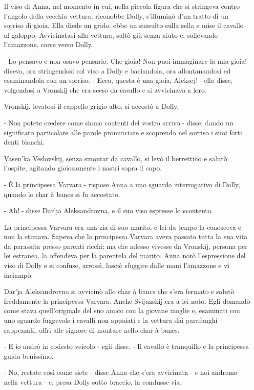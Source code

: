 Il viso di Anna, nel momento in cui, nella piccola figura che si stringeva contro l'angolo della vecchia vettura, riconobbe Dolly, s'illuminò d'un tratto di un sorriso di gioia. Ella diede un grido, ebbe un sussulto sulla sella e mise il cavallo al galoppo. Avvicinatasi alla vettura, saltò giù senza aiuto e, sollevando l'amazzone, corse verso Dolly. 

- Lo pensavo e non osavo pensarlo. Che gioia! Non puoi immaginare la mia gioia!- diceva, ora stringendosi col viso a Dolly e baciandola, ora allontanandosi ed esaminandola con un sorriso. - Ecco, questa è una gioia, Aleksej! - ella disse, volgendosi a Vronskij che era sceso da cavallo e si avvicinava a loro. 

Vronskij, levatosi il cappello grigio alto, si accostò a Dolly. 

- Non potete credere come siamo contenti del vostro arrivo - disse, dando un significato particolare alle parole pronunciate e scoprendo nel sorriso i suoi forti denti bianchi. 

Vasen'ka Veslovskij, senza smontar da cavallo, si levò il berrettino e salutò l'ospite, agitando gioiosamente i nastri sopra il capo. 

- È la principessa Varvara - rispose Anna a uno sguardo interrogativo di Dolly, quando lo char à bancs si fu accostato. 

- Ah! - disse Dar'ja Aleksandrovna, e il suo viso espresse lo scontento. 

La principessa Varvara era una zia di suo marito, e lei da tempo la conosceva e non la stimava. Sapeva che la principessa Varvara aveva passato tutta la sua vita da parassita presso parenti ricchi; ma che adesso vivesse da Vronskij, persona per lei estranea, la offendeva per la parentela del marito. Anna notò l'espressione del viso di Dolly e si confuse, arrossì, lasciò sfuggire dalle mani l'amazzone e vi inciampò. 

Dar'ja Aleksandrovna si avvicinò allo char à bancs che s'era fermato e salutò freddamente la principessa Varvara. Anche Svijazskij era a lei noto. Egli domandò come stava quell'originale del suo amico con la giovane moglie e, esaminati con uno sguardo fuggevole i cavalli non appaiati e la vettura dai parafanghi rappezzati, offrì alle signore di montare nello char à bancs. 

- E io andrò in codesto veicolo - egli disse. - Il cavallo è tranquillo e la principessa guida benissimo. 

- No, restate così come siete - disse Anna che s'era avvicinata - e noi andremo nella vettura - e, presa Dolly sotto braccio, la condusse via. 

